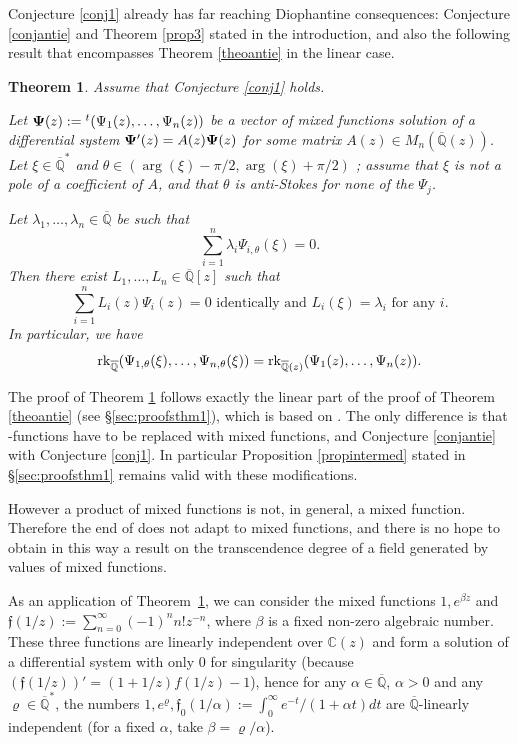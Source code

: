 \documentclass[reqno,12pt]{article}
\numberwithin{equation}{section}
\newtheorem{theo}{Theorem}
\theoremstyle{remark}
\newcommand{\Qbar}{\overline{\mathbb Q}}
\newcommand{\etoile}{^*}
\newcommand{\rk}{{\rm rk}}
\newcommand{\tantie}{{\fontencoding{OT2}\fontfamily{wncyr}\selectfont\CYREREV}}
\newcommand{\antie}{\text{\tantie}}
\newcommand{\fgo}{\mathfrak{f}}
\begin{document}
Conjecture \ref{conj1} already has far reaching Diophantine consequences: Conjecture \ref{conjantie} and Theorem \ref{prop3} stated in the introduction, and also the following   result that encompasses Theorem \ref{theoantie} in the linear case. 




\begin{theo}\label{theomixte} 
Assume that Conjecture \ref{conj1}  holds.

Let ${\bf \Psi}(z):={}^t(\Psi_1(z), \ldots, \Psi_n(z))$ be a vector of mixed functions  solution of a differential system ${\bf \Psi}'(z)=A(z){\bf \Psi}(z)$ for some matrix $A(z)\in M_n(\Qbar(z))$.  Let $\xi\in\Qbar\etoile$ and $\theta\in (\arg(\xi)-\pi/2,\arg(\xi)+\pi/2)$ ; assume that $\xi$ is not a pole of a coefficient of $A$, and that $\theta$ is anti-Stokes for none of the $\Psi_j$. 

Let $\lambda_1,\ldots, \lambda_n  \in\Qbar $ be  such that 
$$\sum_{i=1}^n \lambda_i 
 \Psi_{i,\theta}(\xi) =0.$$
Then there exist $L_1,\ldots, L_n \in \Qbar[z]$  such that 
$$\sum_{i=1}^n L_i(z) \Psi_i(z) = 0 \mbox{ identically  and } L_i(\xi) = \lambda_i  \mbox{ for any } i.$$
In particular, we have
$$\rk_{\Qbar}( \Psi_{1,\theta}(\xi), \ldots, \Psi_{n,\theta}(\xi)) = 
\rk_{\Qbar(z)}( \Psi_{1 }(z), \ldots, \Psi_{n}(z)). $$
\end{theo}

The proof of Theorem \ref{theomixte} follows exactly the linear part of the proof of Theorem \ref{theoantie} (see \S \ref{sec:proofsthm1}), which is based on \cite[\S 3]{beukers}. The only difference is that \antie-functions have to be replaced with mixed functions, and Conjecture \ref{conjantie} with Conjecture \ref{conj1}. In particular Proposition  \ref{propintermed} stated in \S \ref{sec:proofsthm1} remains valid with these modifications. 

However a product of mixed functions is not, in general, a mixed function. Therefore the end of  \cite[\S 3]{beukers} does not adapt to mixed functions, and there is no hope to obtain in this way a result on the transcendence degree of a field generated by values of mixed functions.



 As an application of Theorem~\ref{theomixte}, we can consider the mixed functions $1, e^{\beta z}$ and $\fgo(1/z):=\sum_{n=0}^\infty (-1)^n n! z^{-n}$, where $\beta$ is a fixed non-zero algebraic number. These three functions are linearly independent over $\mathbb C(z)$ and form a solution of a differential system with only 0 for singularity (because $(\fgo(1/z))'=(1+1/z)f(1/z)-1$), hence for any $\alpha\in \Qbar$, $\alpha>0$ and any $\varrho \in \Qbar^*$, the numbers $1, e^{\varrho}, \fgo_0(1/\alpha):=\int_0^\infty e^{-t}/(1+\alpha t)dt$ are $\Qbar$-linearly independent (for a fixed $\alpha$, take $\beta=\varrho/\alpha$).
\end{document}
